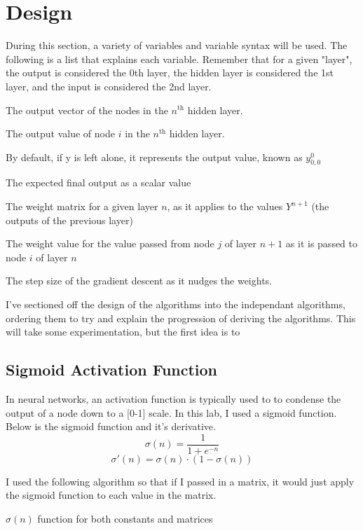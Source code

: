 \documentclass[10pt]{article}
\begin{document}
\newpage
\section{Design}
During this section, a variety of variables and variable syntax will be used. The following is a list that explains each variable. Remember that for a given "layer", the output is considered the 0th layer, the hidden layer is considered the 1st layer, and the input is considered the 2nd layer.
\begin{description}[style=nextline]
    \item[$y^n$] The output vector of the nodes in the $n^{\text{th}}$ hidden layer. 
    \item[$y^n_{i,0}$] The output value of node $i$ in the $n^{\text{th}}$ hidden layer.
    \item[$y$] By default, if y is left alone, it represents the output value, known as $y^0_{0,0}$ 
    \item[$\hat{y}$] The expected final output as a scalar value
    \item[$W^n$] The weight matrix for a given layer $n$, as it applies to the values $Y^{n+1}$ (the outputs of the previous layer) 
    \item[$w^n_{i,j}$] The weight value for the value passed from node $j$ of layer $n+1$ as it is passed to node $i$ of layer $n$
    \item[$\eta$] The step size of the gradient descent as it nudges the weights. 
\end{description}

I've sectioned off the design of the algorithms into the independant algorithms, ordering them to try and explain the progression of deriving the algorithms. 
This will take some experimentation, but the first idea is to 
\subsection{Sigmoid Activation Function}
In neural networks, an activation function is typically used to to condense the output of a node down to a [0-1] scale. In this lab, I used a sigmoid function. Below is the sigmoid function and it's derivative.
$$\sigma(n) = \frac{1}{1 + e^{-n}}$$
$$\sigma'(n) = \sigma(n) \cdot (1 - \sigma(n))$$

I used the following algorithm so that if I passed in a matrix, it would just apply the sigmoid function to each value in the matrix.

\begin{algorithm}[H]
    \caption{$\sigma(n)$ function for both constants and matrices}
\end{algorithm}
\end{document}
